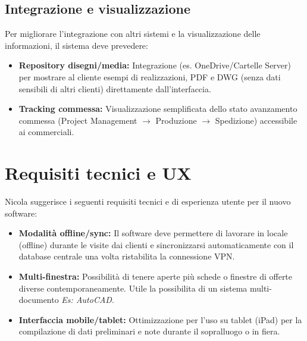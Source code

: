 \documentclass[12pt, a4paper]{article} %
\begin{document}
\subsection{Integrazione e visualizzazione}
Per migliorare l'integrazione con altri sistemi e la visualizzazione delle informazioni, il sistema deve prevedere:
\begin{itemize}
      \item \textbf{Repository disegni/media:} Integrazione (es. OneDrive/Cartelle Server) per mostrare al cliente esempi di realizzazioni,
            PDF e DWG (senza dati sensibili di altri clienti) direttamente dall'interfaccia.
      \item \textbf{Tracking commessa:} Visualizzazione semplificata dello stato avanzamento commessa
            (Project Management $\rightarrow$ Produzione $\rightarrow$ Spedizione) accessibile ai commerciali.
\end{itemize}

\section{Requisiti tecnici e UX}
Nicola suggerisce i seguenti requisiti tecnici e di esperienza utente per il nuovo software:
\begin{itemize}
      \item \textbf{Modalità offline/sync:} Il software deve permettere di lavorare in locale (offline) durante le visite dai clienti
            e sincronizzarsi automaticamente con il database centrale una volta ristabilita la connessione VPN.
      \item \textbf{Multi-finestra:} Possibilità di tenere aperte più schede o finestre di offerte diverse contemporaneamente.
            Utile la possibilita di un sistema multi-documento \textit{Es: AutoCAD}.
      \item \textbf{Interfaccia mobile/tablet:} Ottimizzazione per l'uso su tablet (iPad) per la compilazione di dati preliminari e note durante il sopralluogo o in fiera.
\end{itemize}
\end{document}
